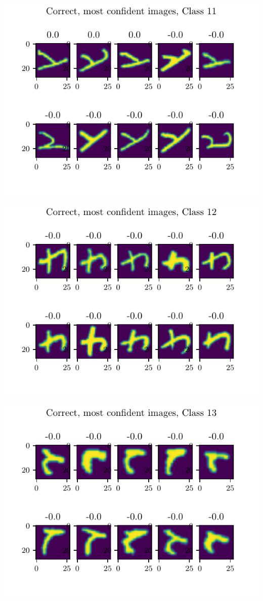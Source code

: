 \documentclass[11pt]{article}
\begin{document}
\includegraphics{figures/2d_confident_imgs_class_11.pdf}

\includegraphics{figures/2d_confident_imgs_class_12.pdf}

\includegraphics{figures/2d_confident_imgs_class_13.pdf}
\end{document}
